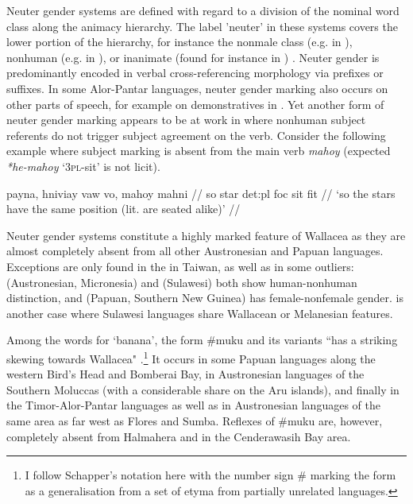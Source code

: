 Neuter gender systems are defined with regard to a division of the nominal word class along the animacy hierarchy. The label 'neuter' in these systems covers the lower portion of the hierarchy, for instance the nonmale class (e.g. in ), nonhuman (e.g. in ), or inanimate (found for instance in ) \citep[128]{schapper2015wallacea}. Neuter gender is predominantly encoded in verbal cross-referencing morphology via prefixes or suffixes. In some Alor-Pantar languages, neuter gender marking also occurs on other parts of speech, for example on demonstratives in . Yet another form of neuter gender marking appears to be at work in  where nonhuman subject referents do not trigger subject agreement on the verb. Consider the following example where subject marking is absent from the main verb \textit{mahoy} (expected \textit{*he-mahoy} `\textsc{3pl}-sit' is not licit).

\ex \label{}
\begingl
\gla payna, hniviay vaw vo, mahoy mahni // 
\glb so star \acs{det}:\acs{pl} \acs{foc} sit fit //
\glft `so the stars have the same position
(lit. are seated alike)' // 
\endgl
\xe

Neuter gender systems constitute a highly marked feature of Wallacea as they are almost completely absent from all other Austronesian and Papuan languages. Exceptions are only found in the  in Taiwan, as well as in some outliers:  (Austronesian, Micronesia) and  (Sulawesi) both show human-nonhuman distinction, and  (Papuan, Southern New Guinea) has female-nonfemale gender.  is another case where Sulawesi languages share Wallacean or Melanesian features.

Among the words for `banana', the form \#muku and its variants ``has a striking skewing towards Wallacea" \citep[132]{schapper2015wallacea}.\footnote{I follow Schapper's notation here with the number sign \# marking the form as a generalisation from a set of etyma from partially unrelated languages.} It occurs in some Papuan languages along the western Bird's Head and Bomberai Bay, in Austronesian languages of the Southern Moluccas (with a considerable share on the Aru islands), and finally in the Timor-Alor-Pantar languages as well as in Austronesian languages of the same area as far west as Flores and Sumba. Reflexes of \#muku are, however, completely absent from Halmahera and in the Cenderawasih Bay area.

